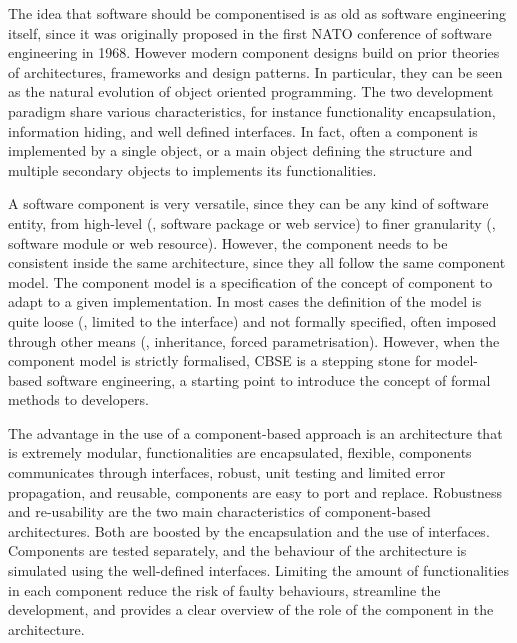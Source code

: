 The idea that software should be componentised is as old as software engineering itself, since it was originally proposed in the first NATO conference of software engineering in 1968. However modern component designs build on prior theories of architectures, frameworks and design patterns. In particular, they can be seen as the natural evolution of object oriented programming. The two development paradigm share various characteristics, for instance functionality encapsulation, information hiding, and well defined interfaces. In fact, often a component is implemented by a single object, or a main object defining the structure and multiple secondary objects to implements its functionalities.

A software component is very versatile, since they can be any kind of software entity, from high-level (\eg, software package or web service) to finer granularity (\eg, software module or web resource). However, the component needs to be consistent inside the same architecture, since they all follow the same component model. The component model is a specification of the concept of component to adapt to a given implementation. In most cases the definition of the model is quite loose (\eg, limited to the interface) and not formally specified, often imposed through other means (\eg, inheritance, forced parametrisation). However, when the component model is strictly formalised, CBSE is a stepping stone for model-based software engineering, a starting point to introduce the concept of formal methods to developers.

The advantage in the use of a component-based approach is an architecture that is extremely modular, functionalities are encapsulated, flexible, components communicates through interfaces, robust, unit testing and limited error propagation, and reusable, components are easy to port and replace. Robustness and re-usability are the two main characteristics of component-based architectures. Both are boosted by the encapsulation and the use of interfaces. Components are tested separately, and the behaviour of the architecture is simulated using the well-defined interfaces. Limiting the amount of functionalities in each component reduce the risk of faulty behaviours, streamline the development, and provides a clear overview of the role of the component in the architecture.

